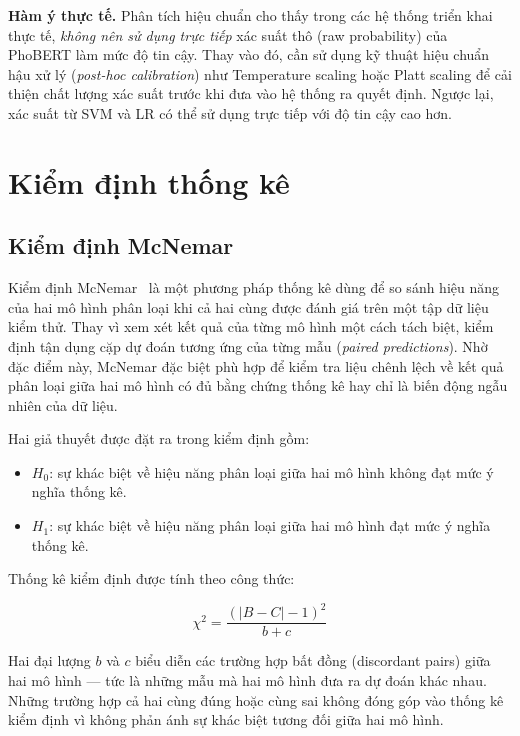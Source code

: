 \textbf{Hàm ý thực tế.} Phân tích hiệu chuẩn cho thấy trong các hệ thống triển khai thực tế, \textit{không nên sử dụng trực tiếp} xác suất thô (raw probability) của PhoBERT làm mức độ tin cậy. Thay vào đó, cần sử dụng kỹ thuật hiệu chuẩn hậu xử lý (\textit{post-hoc calibration}) như Temperature scaling hoặc Platt scaling để cải thiện chất lượng xác suất trước khi đưa vào hệ thống ra quyết định. Ngược lại, xác suất từ SVM và LR có thể sử dụng trực tiếp với độ tin cậy cao hơn.

\section{Kiểm định thống kê}
\label{sec:statistics}

\subsection{Kiểm định McNemar}

Kiểm định McNemar~\cite{mcnemar1947} là một phương pháp thống kê dùng để so sánh hiệu năng của hai mô hình phân loại khi cả hai cùng được đánh giá trên một tập dữ liệu kiểm thử. Thay vì xem xét kết quả của từng mô hình một cách tách biệt, kiểm định tận dụng cặp dự đoán tương ứng của từng mẫu (\textit{paired predictions}). Nhờ đặc điểm này, McNemar đặc biệt phù hợp để kiểm tra liệu chênh lệch về kết quả phân loại giữa hai mô hình có đủ bằng chứng thống kê hay chỉ là biến động ngẫu nhiên của dữ liệu.

Hai giả thuyết được đặt ra trong kiểm định gồm:

\begin{itemize}

    \item $H_0$: sự khác biệt về hiệu năng phân loại giữa hai mô hình không đạt mức ý nghĩa thống kê.

    \item $H_1$: sự khác biệt về hiệu năng phân loại giữa hai mô hình đạt mức ý nghĩa thống kê.

\end{itemize}

Thống kê kiểm định được tính theo công thức:

$$\chi^2 = \frac{(|B - C| - 1)^2}{b + c}$$

Hai đại lượng $b$ và $c$ biểu diễn các trường hợp bất đồng (discordant pairs) giữa hai mô hình --- tức là những mẫu mà hai mô hình đưa ra dự đoán khác nhau. Những trường hợp cả hai cùng đúng hoặc cùng sai không đóng góp vào thống kê kiểm định vì không phản ánh sự khác biệt tương đối giữa hai mô hình.

